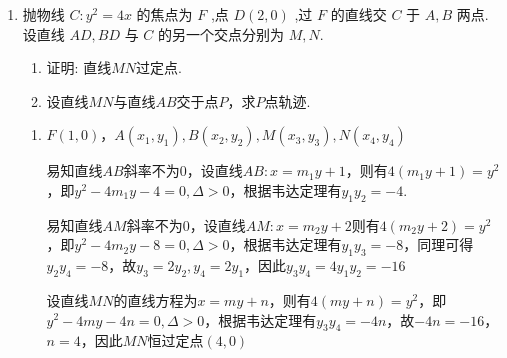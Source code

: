 \begin{enumerate}
\begin{jieda}
\begin{enumerate}
            \item 由题可知$x_M < 0 < x_N$，$x_Q < \sqrt{2} < x_P$，$k_l \in (1, +\infty)$，或$k_l$不存在，$k_m \in \left[\dfrac{\sqrt{2}}{4}, 1\right)$
            
            $|F_2M| = \sqrt{(x_M-\sqrt{2})^2+y_M^2} = -\sqrt{2}x_M+1$，同理$|F_2N| = \sqrt{2}x_N - 1$，故$|MN| = 2-\sqrt{2}(x_M+x_N)$

            $|F_2P| = \sqrt{2}x_P - 1$，$|F_2Q| = \sqrt{2}x_Q - 1$，故$|PQ| = \sqrt{2}(x_P + x_Q) - 2$

            设直线$PQ: y = k_l(x-\sqrt{2})$，与双曲线联立得$(1-k_l^2)x^2+2\sqrt{2}k_l^2x-(2k_l^2+1)=0$

            $\Delta>0$, $x_P+x_Q=-\dfrac{2\sqrt{2}k_l^2}{1-k_l^2}$，故$|PQ|= \dfrac{-4k_l^2}{1-k_l^2}-2 \in (2,+\infty)$, 当$k_l$不存在时，$|PQ|=2$，故$|PQ|\in [2,+\infty)$

            同理可得$|MN|=2+\dfrac{4k_m^2}{1-k_m^2}$，故$|MN|$随$k_m$增大严增，$|MN|\in \left[\dfrac{18}{7},+\infty\right)$

            因此当$\lambda \geq \dfrac{9}{7}$满足要求.
        \end{enumerate}
    \end{jieda}
    
    \item 抛物线 $C : y^2 = 4x$ 的焦点为 $F$ ,点 $D\left(2, 0\right)$ ,过 $F$ 的直线交 $C$ 于 $A,B$ 两点. 设直线 ${AD},{BD}$ 与 $C$ 的另一个交点分别为 $M,N$.
    \begin{enumerate}
        \item 证明: 直线$MN$过定点.
        \item 设直线$MN$与直线$AB$交于点$P$，求$P$点轨迹.
    \end{enumerate}
    \begin{jieda}
        \begin{enumerate}
            \item $F(1, 0)$，$A(x_1, y_1), B(x_2, y_2), M(x_3, y_3), N(x_4, y_4)$
            
            易知直线$AB$斜率不为0，设直线$AB: x = m_1y+1$，则有$4(m_1y+1) = y^2$，即$y^2-4m_1y-4 = 0, \Delta > 0$，根据韦达定理有$y_1y_2 = -4$.
            
            易知直线$AM$斜率不为0，设直线$AM: x = m_2y+2$则有$4(m_2y+2) = y^2$，即$y^2-4m_2y-8 = 0, \Delta > 0$，根据韦达定理有$y_1y_3 = -8$，同理可得$y_2y_4 = -8$，故$y_3 = 2y_2, y_4 = 2y_1$，因此$y_3y_4 = 4y_1y_2 = -16$

            设直线$MN$的直线方程为$x = my+n$，则有$4(my+n) = y^2$，即$y^2-4my-4n = 0, \Delta > 0$，根据韦达定理有$y_3y_4 = -4n$，故$-4n = -16$，$n = 4$，因此$MN$恒过定点$(4, 0)$


\end{enumerate}
\end{jieda}
\end{enumerate}
